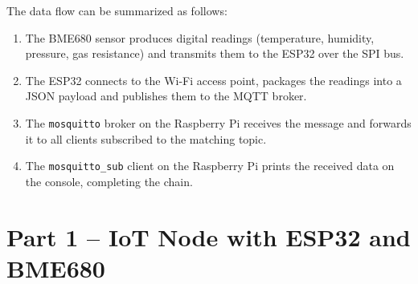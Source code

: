 \documentclass[12pt,a4paper]{report}
\begin{document}

The data flow can be summarized as follows:
\begin{enumerate}
    \item The BME680 sensor produces digital readings (temperature, humidity, pressure, gas resistance) and transmits them to the ESP32 over the SPI bus.
    \item The ESP32 connects to the Wi-Fi access point, packages the readings into a JSON payload and publishes them to the MQTT broker.
    \item The \texttt{mosquitto} broker on the Raspberry Pi receives the message and forwards it to all clients subscribed to the matching topic.
    \item The \texttt{mosquitto\_sub} client on the Raspberry Pi prints the received data on the console, completing the chain.
\end{enumerate}

\chapter{Part 1 -- IoT Node with ESP32 and BME680}
 
\end{document}
